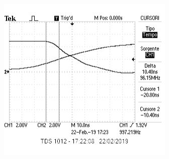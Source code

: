 \documentclass{article}
\begin{document}
	\begin{minipage}{.5\linewidth}
		\centering
		\includegraphics[width=\linewidth]{figure/TLH}
		\label{fig:TLH}
	\end{minipage}
	
\end{document}
